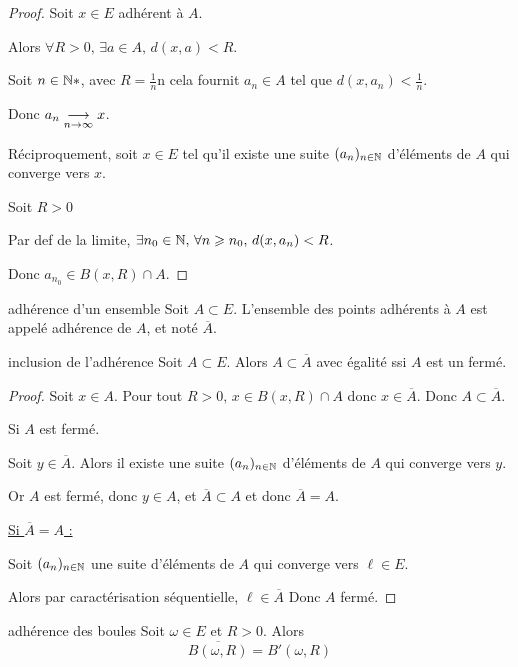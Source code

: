 \begin{proof}
    Soit $x \in E$ adhérent à $A$. 

    Alors $\forall R > 0, \, \exists a \in A, \, d(x, a) < R$.

    Soit $n \in \mathbb{N}*$, avec $R = \frac 1 n$n cela fournit $a_n \in A$ tel que $d(x, a_n) < \frac 1 n$.

    Donc $a_n \underset{n \to \infty}{\longrightarrow} x$.

    Réciproquement, soit $x \in E$ tel qu'il existe une suite $(a_n)_{n \in \mathbb{N}}$ d'éléments 
    de $A$ qui converge vers $x$. 

    Soit $R > 0$ 

    Par def de la limite, $\exists n_0 \in \mathbb{N}, \, \forall n \geqslant n_0, \, d(x, a_n) < R$.

    Donc $a_{n_0} \in B(x, R) \cap A$. 
\end{proof}

\begin{definition}{adhérence d'un ensemble}{}
    Soit $A \subset E$. 
    L'ensemble des points adhérents à $A$ est appelé adhérence de $A$, et noté 
    $\overline{A}$.
\end{definition}

\begin{proposition}{inclusion de l'adhérence}{}
    Soit $A \subset E$. Alors $A \subset \overline{A}$ avec égalité ssi $A$ est un fermé.
\end{proposition}

\begin{proof}
    Soit $x \in A$. Pour tout $R > 0, \, x \in B(x, R) \cap A$ donc $x \in \overline{A}$.
    Donc $A \subset \overline{A}$.

    \avspace Si $A$ est fermé. 

    Soit $y \in \overline{A}$. Alors il existe une suite $(a_n)_{n \in \mathbb{N}}$ d'éléments
    de $A$ qui converge vers $y$.

    Or $A$ est fermé, donc $y \in A$, et $\overline{A} \subset A$ et donc $\overline{A} = A$.

    \qquad \avspace \uline{Si $\overline{A} = A$ : }

    \svspace Soit $(a_n)_{n \in \mathbb{N}}$ une suite d'éléments de $A$ qui converge vers $\ell \in E$.

    Alors par caractérisation séquentielle, $\ell \in \overline{A} $ Donc $A$ fermé. 
\end{proof}

\begin{proposition}{adhérence des boules}{}
    Soit $\omega \in E$ et $R > 0$. Alors
     $$\overline{B(\omega, R)} = B'(\omega, R)$$
\end{proposition}

